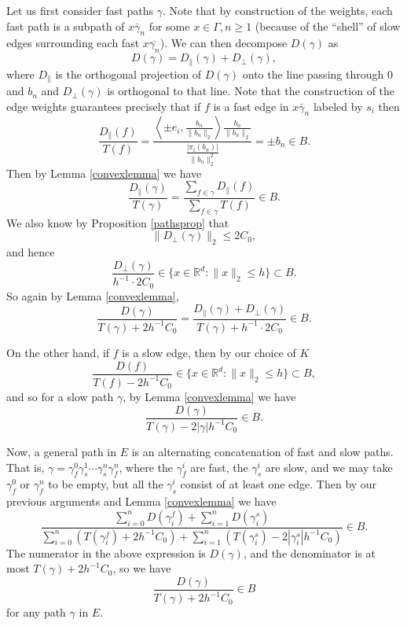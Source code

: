 \documentclass[12pt,reqno]{article}
\numberwithin{equation}{section}
\newcommand{\R}{\mathbb{R}}
\newcommand{\pair}[2]{\left\langle #1, #2 \right\rangle}
\begin{document}
Let us first consider fast paths $\gamma$. Note that by construction of the weights, each fast path is a subpath of $x\bar{\gamma}_n$ for some
$x \in \Gamma, n \ge 1$ (because of the ``shell'' of slow edges surrounding each fast $x \bar{\gamma_n}$). 
We can then decompose $D(\gamma)$ as
\[ 
   D(\gamma) = D_{\parallel}(\gamma) + D_{\perp}(\gamma), 
\]
where $D_{\parallel}$ is the orthogonal projection of $D(\gamma)$ onto the line passing through $0$ and $b_n$ and $D_{\perp}(\gamma)$
is orthogonal to that line. Note that the construction of the edge weights guarantees precisely that if $f$ is a fast edge in 
$x\bar{\gamma}_n$ labeled by $s_i$ then
\[ \frac{D_{\parallel}(f)}{T(f)} = \frac{ \pair{ \pm e_i }{ \frac{b_n}{\|b_n\|_2} } \frac{b_n}{\| b_n \|_2 } }{ \frac{ |\pi_i(b_n)| }{ \|b_n\|_2^2 }}
= \pm b_n \in B. \]
Then by Lemma \ref{convexlemma} we have
\[ \frac{ D_{\parallel}(\gamma) }{ T(\gamma) } = \frac{ \sum_{f \in \gamma} D_{\parallel}(f) }{ \sum_{f \in \gamma} T(f) } \in B. \]
We also know by Proposition \ref{pathsprop} that 
\[ 
   \|D_{\perp}(\gamma)\|_2 \le 2 C_0, 
\]
and hence
\[ 
   \frac{ D_{\perp}(\gamma) }{ h^{-1} \cdot 2 C_0 } \in \{ x \in \R^d : \|x\|_2 \le h \} \subset B. 
\]
So again by Lemma \ref{convexlemma},
\[ 
   \frac{ D(\gamma) }{ T(\gamma) + 2 h^{-1} C_0 } = \frac{ D_{\parallel}(\gamma) + D_{\perp}(\gamma) }{ T(\gamma) + h^{-1} \cdot 2C_0 } \in B.
\]

On the other hand, if $f$ is a slow edge, then by our choice of $K$
\[ 
   \frac{ D(f) }{ T(f) - 2 h^{-1} C_0 } \in \{ x \in \R^d : \|x\|_2 \le h \} \subset B,
\]
and so for a slow path $\gamma$, by Lemma \ref{convexlemma} we have
\[
   \frac{ D(\gamma) }{ T(\gamma) - 2 |\gamma| h^{-1} C_0} \in B.
\]

Now, a general path in $E$ is an alternating concatenation of fast and slow paths. That is,
$\gamma = \gamma_f^0 \gamma_s^1 \cdots \gamma_s^n \gamma_f^n$, where the $\gamma_f^i$ are fast, the $\gamma_s^i$ are slow,
and we may take $\gamma_f^0$ or $\gamma_f^n$ to be empty, but all the $\gamma_s^i$ consist of at least one edge. Then by 
our previous arguments and Lemma \ref{convexlemma} we have
\[
   \frac{\sum_{i=0}^n D(\gamma_i^f) + \sum_{i=1}^n D(\gamma_i^s)}
   {\sum_{i=0}^n (T(\gamma_i^f) + 2h^{-1} C_0 ) + \sum_{i=1}^n (T(\gamma_i^s) - 2 |\gamma_i^s| h^{-1} C_0)} \in B.
\]
The numerator in the above expression is $D(\gamma)$, and the denominator is at most $T(\gamma) + 2 h^{-1} C_0$,
so we have
\[
   \frac{D(\gamma)}{T(\gamma) + 2h^{-1} C_0} \in B
\]
for any path $\gamma$ in $E$.
\end{document}
